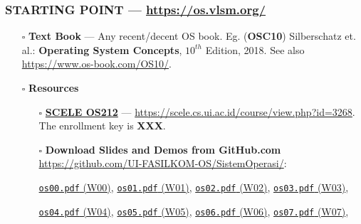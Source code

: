 \begin{frame}[fragile]
\frametitle{\textbf{STARTING POINT} --- 
{
\hypersetup{colorlinks,linkcolor=,urlcolor=links}
\url{https://os.vlsm.org/}
}
}
\begin{itemize}
\item[$\square$] \textbf{Text Book} ---
                 Any recent/decent OS book. Eg. (\textbf{OSC10}) Silberschatz et. al.: 
                 \textbf{Operating System Concepts}, $10^{th}$ Edition, 2018.
                 See also \url{https://www.os-book.com/OS10/}.
\item[$\square$] \textbf{Resources}
\begin{itemize}
\item[$\square$] \href{https://scele.cs.ui.ac.id/course/view.php?id=3268}{\textbf{SCELE OS212}} ---
\url{https://scele.cs.ui.ac.id/course/view.php?id=3268}.\\
The enrollment key is \textbf{XXX}.
\item[$\square$] \textbf{Download Slides and Demos from GitHub.com} \\
\url{https://github.com/UI-FASILKOM-OS/SistemOperasi/}:

                 {\scriptsize%
                 \href{https://os.vlsm.org/Slides/os00.pdf}{\texttt{os00.pdf} (W00)},
                 \href{https://os.vlsm.org/Slides/os01.pdf}{\texttt{os01.pdf} (W01)},
                 \href{https://os.vlsm.org/Slides/os02.pdf}{\texttt{os02.pdf} (W02)},
                 \href{https://os.vlsm.org/Slides/os03.pdf}{\texttt{os03.pdf} (W03)},

                 \href{https://os.vlsm.org/Slides/os04.pdf}{\texttt{os04.pdf} (W04)},
                 \href{https://os.vlsm.org/Slides/os05.pdf}{\texttt{os05.pdf} (W05)},
                 \href{https://os.vlsm.org/Slides/os06.pdf}{\texttt{os06.pdf} (W06)},
                 \href{https://os.vlsm.org/Slides/os07.pdf}{\texttt{os07.pdf} (W07)},

}
\end{itemize}
\end{itemize}
\end{frame}

